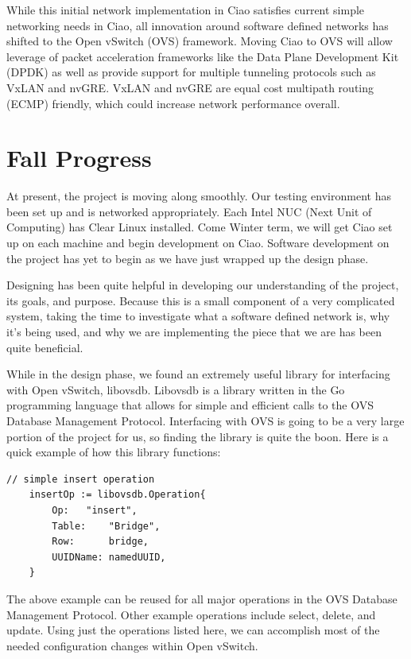 \documentclass[10pt,onecolumn,journal,draftclsnofoot]{IEEEtran}
\begin{document}
While this initial network implementation in Ciao satisfies current simple
networking needs in Ciao, all innovation around software defined networks has
shifted to the Open vSwitch (OVS) framework. Moving Ciao to OVS will allow
leverage of packet acceleration frameworks like the Data Plane Development Kit
(DPDK) as well as provide support for multiple tunneling protocols such as VxLAN
and nvGRE. VxLAN and nvGRE are equal cost multipath routing (ECMP) friendly,
which could increase network performance overall.

\section{Fall Progress}
At present, the project is moving along smoothly. Our testing environment has
been set up and is networked appropriately. Each Intel NUC (Next Unit of
Computing) has Clear Linux installed. Come Winter term, we will get Ciao set up
on each machine and begin development on Ciao. Software development on the
project has yet to begin as we have just wrapped up the design phase.

Designing has been quite helpful in developing our understanding of the project,
its goals, and purpose. Because this is a small component of a very complicated
system, taking the time to investigate what a software defined network is, why
it's being used, and why we are implementing the piece that we are has been
quite beneficial.

While in the design phase, we found an extremely useful library for interfacing
with Open vSwitch, libovsdb. Libovsdb is a library written in the Go programming
language that allows for simple and efficient calls to the OVS Database
Management Protocol. Interfacing with OVS is going to be a very large
portion of the project for us, so finding the library is quite the boon. Here
is a quick example of how this library functions:\cite{gosample}\\

\begin{lstlisting}[caption=Example insert operation using libovsdb]
	// simple insert operation
	insertOp := libovsdb.Operation{
		Op:	  "insert",
		Table:	  "Bridge",
		Row:	  bridge,
		UUIDName: namedUUID,
	}
\end{lstlisting}

The above example can be reused for all major operations in the OVS Database
Management Protocol. Other example operations include select, delete, and
update. Using just the operations listed here, we can accomplish most of the
needed configuration changes within Open vSwitch.
\end{document}

